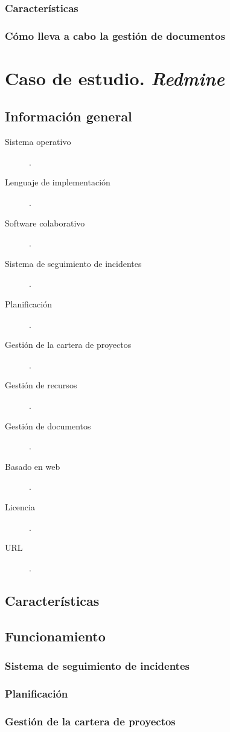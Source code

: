 \documentclass[11pt,a4paper,spanish,twoside]{report}
\begin{document}
	\subsection{Características}
	\subsection{Cómo lleva a cabo la gestión de documentos}

\chapter{Caso de estudio. \emph{Redmine}}
\section{Información general}
	\begin{description}
		\item[Sistema operativo]. 
		\item[Lenguaje de implementación].
    \item[Software colaborativo]. 
    \item[Sistema de seguimiento de incidentes]. 
		\item[Planificación].
		\item[Gestión de la cartera de proyectos].
		\item[Gestión de recursos].
		\item[Gestión de documentos].
		\item[Basado en web].
		\item[Licencia].
		\item[URL].
	\end{description}
\section{Características}
\section{Funcionamiento}
	\subsection{Sistema de seguimiento de incidentes}
	\subsection{Planificación}
	\subsection{Gestión de la cartera de proyectos}
\end{document}
